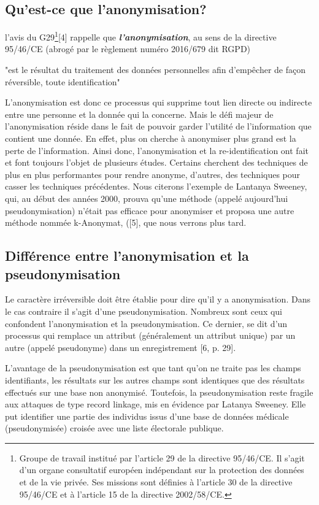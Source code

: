 \subsection{Qu'est-ce que l’anonymisation?} 

l’avis du G29\footnote{Groupe de travail institué par l’article 29 de la directive 95/46/CE. Il s’agit d’un organe consultatif européen indépendant
sur la protection des données et de la vie privée. Ses missions sont définies à l’article 30 de la directive 95/46/CE et à l’article
15 de la directive 2002/58/CE.}[4] rappelle que \textbf{\emph{l’anonymisation}}, au sens de la directive 95/46/CE (abrogé par le règlement numéro 2016/679 dit \gls{RGPD})
\begin{em}
    "est le résultat du traitement des données personnelles afin d’empêcher de façon réversible, toute identification"
\end{em}  

L’anonymisation est donc ce processus qui supprime tout lien directe ou indirecte entre une personne et la donnée qui la concerne. Mais le défi majeur de l’anonymisation réside dans le fait de pouvoir garder l’utilité de l’information que contient une donnée.  En effet, plus on cherche à anonymiser plus grand est la perte de l’information.  
Ainsi donc, l’anonymisation et la re-identification ont fait et font toujours l’objet de plusieurs études. Certains cherchent des techniques de plus en plus performantes pour rendre anonyme, d’autres, des techniques pour casser les techniques précédentes. Nous citerons l'exemple de Lantanya Sweeney, qui, au début des années 2000, prouva qu’une méthode (appelé aujourd’hui pseudonymisation) n’était pas efficace pour anonymiser et   proposa une autre méthode nommée k-Anonymat, ([5], que nous verrons plus tard. 

\subsection{Différence entre l’anonymisation et la pseudonymisation}

Le caractère irréversible doit être établie pour dire qu’il y a anonymisation. Dans le cas contraire il s’agit d’une pseudonymisation. Nombreux sont ceux qui confondent l’anonymisation et la pseudonymisation. Ce dernier, se dit d’un processus qui remplace un attribut (généralement un attribut unique) par un autre (appelé pseudonyme) dans un enregistrement [6, p. 29]. 

L’avantage de la pseudonymisation est que tant qu’on ne traite pas les champs identifiants, les résultats sur les autres champs sont identiques que des résultats effectués sur une base non anonymisé. Toutefois, la pseudonymisation reste fragile aux attaques de type record linkage, mis en évidence par Latanya Sweeney. Elle put identifier une partie des individus issus d’une base de données médicale (pseudonymisée) croisée avec une liste électorale publique. 

